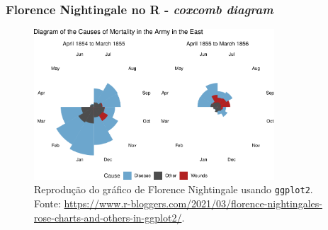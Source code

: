 \begin{frame}[allowframebreaks]
\frametitle{Florence Nightingale no R - \emph{coxcomb diagram}}
\begin{figure}[h]
 \centering
 \includegraphics[width=0.8\textwidth,height=0.65\textheight,keepaspectratio]{figures/nightingale-R.pdf}
 \caption{\small Reprodução do gráfico de Florence Nightingale usando \texttt{ggplot2}. Fonte: \url{https://www.r-bloggers.com/2021/03/florence-nightingales-rose-charts-and-others-in-ggplot2/}.}
 \label{fig-nightingale-R}
\end{figure}

\framebreak



\end{frame}


